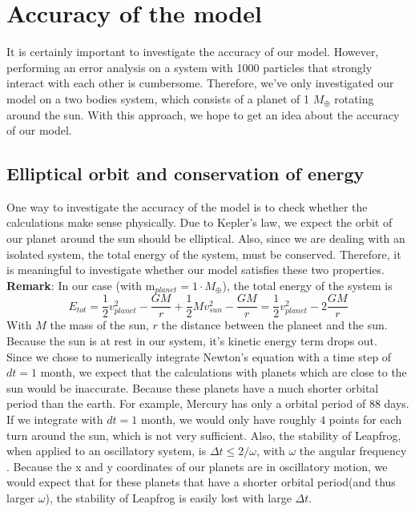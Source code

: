 \section{Accuracy of the model}
It is certainly important to investigate the accuracy of our model. 
However, performing an error analysis on a system with 1000 particles that strongly interact with each other is cumbersome. 
Therefore, we've only investigated our model on a two bodies system, which consists of a planet of 1 $M_{\oplus}$ rotating around the sun. 
With this approach, we hope to get an idea about the accuracy of our model.

\subsection{Elliptical orbit and conservation of energy}
One way to investigate the accuracy of the model is to check whether the calculations make sense physically. Due to Kepler's law, we expect the orbit of our planet around the sun should be elliptical. 
Also, since we are dealing with an isolated system, the total energy of the system, must be conserved. 
Therefore, it is meaningful to investigate whether our model satisfies these two properties.\\ 

\textbf{Remark}: In our case (with $\text{m}_{planet}=1\cdot M_{\oplus}$), the total energy of the system is \cite{Energy}
\[E_{tot}=\frac{1}{2}v_{planet}^2-\frac{GM}{r}+\frac{1}{2}Mv_{sun}^2-\frac{GM}{r}=\frac{1}{2}v_{planet}^2-2\frac{GM}{r}\]
With $M$ the mass of the sun, $r$ the distance between the planeet and the sun. 
Because the sun is at rest in our system, it's kinetic energy term drops out.\\

Since we chose to numerically integrate Newton's equation with a time step of $dt=1$ month, we expect that the calculations with planets which are close to the sun would be inaccurate. 
Because these planets have a much shorter orbital period than the earth. 
For example, Mercury has only a orbital period of 88 days. If we integrate with $dt=1$ month, we would only have roughly $4$ points for each turn around the sun, which is not very sufficient. 
Also, the stability of Leapfrog, when applied to an oscillatory system, is $\Delta t\leq 2/\omega$, with $\omega$ the angular frequency \cite{StabLeapfrog}. 
Because the x and y coordinates of our planets are in oscillatory motion, we would expect that for these planets that have a shorter orbital period(and thus larger $\omega$), the stability of Leapfrog is easily lost with large $\Delta t$.\\

